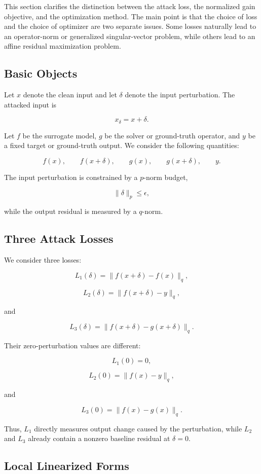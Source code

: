 \documentclass{article}
\begin{document}
This section clarifies the distinction between the attack loss, the normalized gain objective, and the optimization method. The main point is that the choice of loss and the choice of optimizer are two separate issues. Some losses naturally lead to an operator-norm or generalized singular-vector problem, while others lead to an affine residual maximization problem.

\subsection{Basic Objects}

Let \(x\) denote the clean input and let \(\delta\) denote the input perturbation. The attacked input is

\[
x_\delta = x+\delta.
\]

Let \(f\) be the surrogate model, \(g\) be the solver or ground-truth operator, and \(y\) be a fixed target or ground-truth output. We consider the following quantities:

\[
f(x), \qquad f(x+\delta), \qquad g(x), \qquad g(x+\delta), \qquad y.
\]

The input perturbation is constrained by a \(p\)-norm budget,

\[
\|\delta\|_p \leq \epsilon,
\]

while the output residual is measured by a \(q\)-norm.

\subsection{Three Attack Losses}

We consider three losses:

\[
L_1(\delta)
=
\|f(x+\delta)-f(x)\|_q,
\]

\[
L_2(\delta)
=
\|f(x+\delta)-y\|_q,
\]

and

\[
L_3(\delta)
=
\|f(x+\delta)-g(x+\delta)\|_q.
\]

Their zero-perturbation values are different:

\[
L_1(0)=0,
\]

\[
L_2(0)=\|f(x)-y\|_q,
\]

and

\[
L_3(0)=\|f(x)-g(x)\|_q.
\]

Thus, \(L_1\) directly measures output change caused by the perturbation, while \(L_2\) and \(L_3\) already contain a nonzero baseline residual at \(\delta=0\).

\subsection{Local Linearized Forms}
\end{document}
